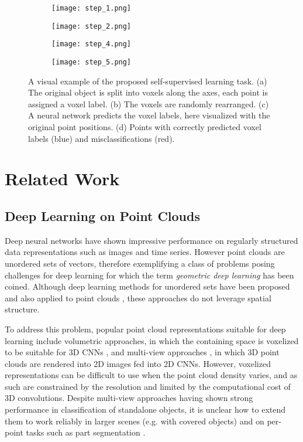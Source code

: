 \documentclass{article}
\begin{document}
\begin{figure}[t]
  \centering
  \begin{subfigure}{.49\linewidth}
  \centering
  \texttt{[image: step\_1.png]}
  \label{fig:sub1}
  \caption{}
  \end{subfigure}\begin{subfigure}{.49\linewidth}
  \centering
  \texttt{[image: step\_2.png]}
  \label{fig:sub2}
  \caption{}
  \end{subfigure}
  \begin{subfigure}{.49\linewidth}
  \centering
  \texttt{[image: step\_4.png]}
  \label{fig:sub4}
  \caption{}
  \end{subfigure}
  \begin{subfigure}{.49\linewidth}
  \centering
  \texttt{[image: step\_5.png]}
  \label{fig:sub5}
  \caption{}
  \end{subfigure}
  \caption{A visual example of the proposed self-supervised learning task. (a) The original object is split into voxels along the axes, each point is assigned a voxel label. (b) The voxels are randomly rearranged. (c) A neural network predicts the voxel labels, here visualized with the original point positions. (d) Points with correctly predicted voxel labels (blue) and misclassifications (red).}
  \label{method_figure}
\end{figure}
\section{Related Work}
\label{relatedwork}

\subsection{Deep Learning on Point Clouds}

Deep neural networks have shown impressive performance on regularly structured data representations such as images and time series. However point clouds are unordered sets of vectors, therefore exemplifying a class of problems posing challenges for deep learning for which the term \textit{geometric deep learning} \cite{geometric} has been coined. Although deep learning methods for unordered sets \cite{sets1, sets2} have been proposed and also applied to point clouds \cite{sets3}, these approaches do not leverage spatial structure. 

To address this problem, popular point cloud representations suitable for deep learning include volumetric approaches, in which the containing space is voxelized to be suitable for 3D CNNs \cite{voxnet, volumetric, volumetric2}, and multi-view approaches \cite{multiview, multiview2}, in which 3D point clouds are rendered into 2D images fed into 2D CNNs. However, voxelized representations can be difficult to use when the point cloud density varies, and as such are constrained by the resolution and limited by the computational cost of 3D convolutions. Despite multi-view approaches having shown strong performance in classification of standalone objects, it is unclear how to extend them to work reliably in larger scenes (e.g. with covered objects) and on per-point tasks such as part segmentation \cite{pointnet}. 
\end{document}
